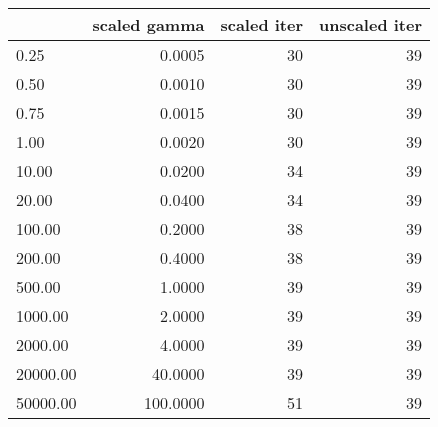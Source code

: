 \begin{tabular}{lrrr}
\toprule
{} &  scaled gamma &  scaled iter &  unscaled iter \\
\midrule
0.25     &        0.0005 &           30 &             39 \\
0.50     &        0.0010 &           30 &             39 \\
0.75     &        0.0015 &           30 &             39 \\
1.00     &        0.0020 &           30 &             39 \\
10.00    &        0.0200 &           34 &             39 \\
20.00    &        0.0400 &           34 &             39 \\
100.00   &        0.2000 &           38 &             39 \\
200.00   &        0.4000 &           38 &             39 \\
500.00   &        1.0000 &           39 &             39 \\
1000.00  &        2.0000 &           39 &             39 \\
2000.00  &        4.0000 &           39 &             39 \\
20000.00 &       40.0000 &           39 &             39 \\
50000.00 &      100.0000 &           51 &             39 \\
\bottomrule
\end{tabular}
